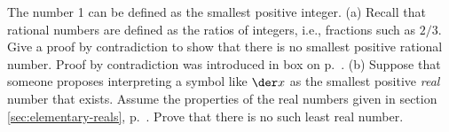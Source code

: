 The number 1 can be defined as the smallest positive integer.
(a) Recall that rational numbers are defined as the ratios of integers, i.e.,
fractions such as $2/3$. Give a proof by contradiction
to show that there is no smallest positive rational number.
Proof by contradiction was introduced in box
 on p.~\pageref{fig:proof-by-contradiction}.
(b) Suppose that someone proposes interpreting a symbol like $\der x$ as the
smallest positive \emph{real} number that exists. Assume the properties of
the real numbers given in section \ref{sec:elementary-reals},
p.~\pageref{sec:elementary-reals}. Prove
that there is no such least real number.

